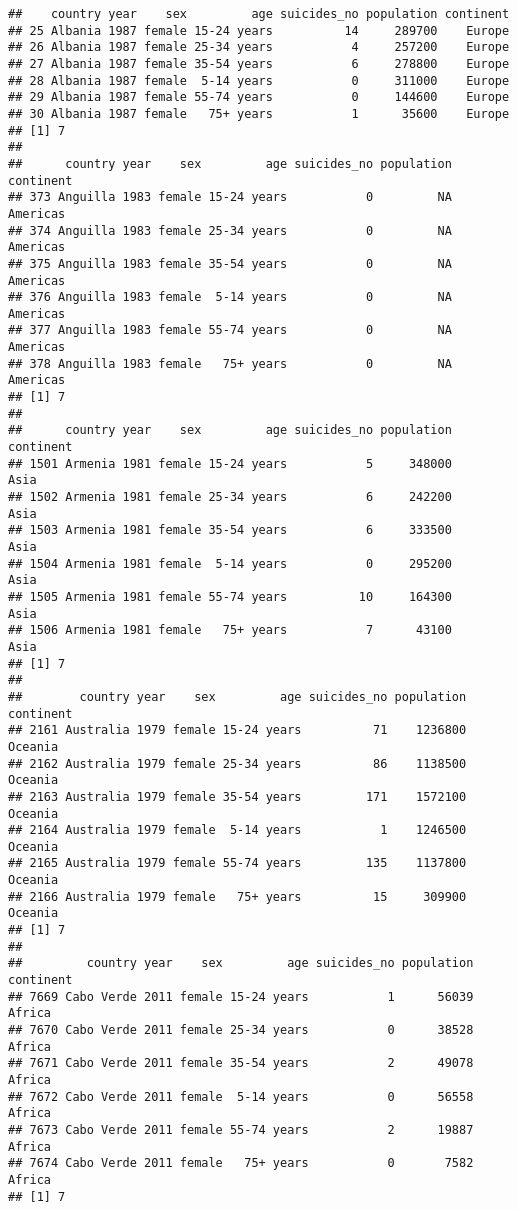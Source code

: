 \documentclass[]{article}
\begin{document}
\begin{verbatim}
##    country year    sex         age suicides_no population continent
## 25 Albania 1987 female 15-24 years          14     289700    Europe
## 26 Albania 1987 female 25-34 years           4     257200    Europe
## 27 Albania 1987 female 35-54 years           6     278800    Europe
## 28 Albania 1987 female  5-14 years           0     311000    Europe
## 29 Albania 1987 female 55-74 years           0     144600    Europe
## 30 Albania 1987 female   75+ years           1      35600    Europe
## [1] 7
## 
##      country year    sex         age suicides_no population continent
## 373 Anguilla 1983 female 15-24 years           0         NA  Americas
## 374 Anguilla 1983 female 25-34 years           0         NA  Americas
## 375 Anguilla 1983 female 35-54 years           0         NA  Americas
## 376 Anguilla 1983 female  5-14 years           0         NA  Americas
## 377 Anguilla 1983 female 55-74 years           0         NA  Americas
## 378 Anguilla 1983 female   75+ years           0         NA  Americas
## [1] 7
## 
##      country year    sex         age suicides_no population continent
## 1501 Armenia 1981 female 15-24 years           5     348000      Asia
## 1502 Armenia 1981 female 25-34 years           6     242200      Asia
## 1503 Armenia 1981 female 35-54 years           6     333500      Asia
## 1504 Armenia 1981 female  5-14 years           0     295200      Asia
## 1505 Armenia 1981 female 55-74 years          10     164300      Asia
## 1506 Armenia 1981 female   75+ years           7      43100      Asia
## [1] 7
## 
##        country year    sex         age suicides_no population continent
## 2161 Australia 1979 female 15-24 years          71    1236800   Oceania
## 2162 Australia 1979 female 25-34 years          86    1138500   Oceania
## 2163 Australia 1979 female 35-54 years         171    1572100   Oceania
## 2164 Australia 1979 female  5-14 years           1    1246500   Oceania
## 2165 Australia 1979 female 55-74 years         135    1137800   Oceania
## 2166 Australia 1979 female   75+ years          15     309900   Oceania
## [1] 7
## 
##         country year    sex         age suicides_no population continent
## 7669 Cabo Verde 2011 female 15-24 years           1      56039    Africa
## 7670 Cabo Verde 2011 female 25-34 years           0      38528    Africa
## 7671 Cabo Verde 2011 female 35-54 years           2      49078    Africa
## 7672 Cabo Verde 2011 female  5-14 years           0      56558    Africa
## 7673 Cabo Verde 2011 female 55-74 years           2      19887    Africa
## 7674 Cabo Verde 2011 female   75+ years           0       7582    Africa
## [1] 7
\end{verbatim}
\end{document}
